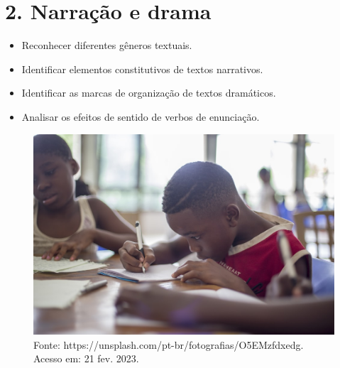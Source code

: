 \chapter{2. Narração e drama}



\begin{itemize}
\item Reconhecer diferentes gêneros textuais.

\item Identificar elementos constitutivos de textos narrativos.

\item Identificar as marcas de organização de textos dramáticos.

\item Analisar os efeitos de sentido de verbos de enunciação.
\end{itemize}

\begin{figure}[htpb!]
\includegraphics[width=.5\textwidth]{./imgs/img4.jpg}
\caption{Fonte: https://unsplash.com/pt-br/fotografias/O5EMzfdxedg. Acesso em: 21 fev. 2023.}
\end{figure}

